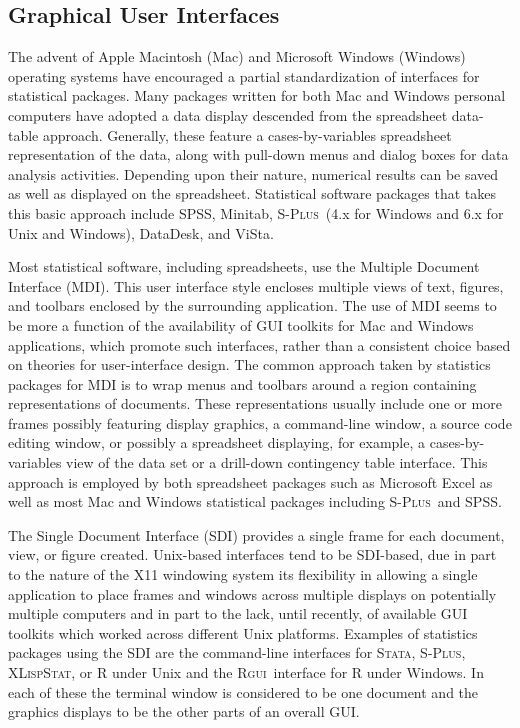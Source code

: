 \documentclass{article}
\newcommand*{\Splus}{\textsc{S-Plus}}
\newcommand*{\XLispStat}{\textsc{XLispStat}}
\newcommand*{\Stata}{\textsc{Stata}}
\newcommand*{\Rgui}{\textsc{Rgui}}
\begin{document}
\subsection{Graphical User Interfaces}
\label{sec:UI:GUI}

The advent of Apple Macintosh (Mac) and Microsoft Windows (Windows)
operating systems have encouraged a partial standardization of
interfaces for statistical packages.  Many packages written for both
Mac and Windows personal computers have adopted a data display
descended from the spreadsheet data-table approach.  Generally, these
feature a cases-by-variables spreadsheet representation of the data,
along with pull-down menus and dialog boxes for data analysis
activities.  Depending upon their nature, numerical results can be
saved as well as displayed on the spreadsheet.  Statistical software
packages that takes this basic approach include SPSS, Minitab, \Splus\ 
(4.x for Windows and 6.x for Unix and Windows), DataDesk, and ViSta.

Most statistical software, including spreadsheets, use the Multiple
Document Interface (MDI).  This user interface style encloses multiple
views of text, figures, and toolbars enclosed by the surrounding
application.  The use of MDI seems to be more a function of the
availability of GUI toolkits for Mac and Windows applications, which
promote such interfaces, rather than a consistent choice based on
theories for user-interface design.  The common approach taken by
statistics packages for MDI is to wrap menus and toolbars around a
region containing representations of documents.  These representations
usually include one or more frames possibly featuring display
graphics, a command-line window, a source code editing window, or
possibly a spreadsheet displaying, for example, a cases-by-variables
view of the data set or a drill-down contingency table interface.
This approach is employed by both spreadsheet packages such as
Microsoft Excel as well as most Mac and Windows statistical packages
including \Splus\ and SPSS.

The Single Document Interface (SDI) provides a single frame for each
document, view, or figure created.  Unix-based interfaces tend to be
SDI-based, due in part to the nature of the X11 windowing system its
flexibility in allowing a single application to place frames and
windows across multiple displays on potentially multiple computers and in part
to the lack, until recently, of available GUI
toolkits which worked across different Unix platforms.
Examples of statistics packages using the SDI are the
command-line interfaces for \Stata, \Splus, \XLispStat, or R under Unix 
and the \Rgui\ interface for R under Windows.  In each of these the
terminal window is considered to be one document and the graphics displays to be the
other parts of an overall GUI.
\end{document}
